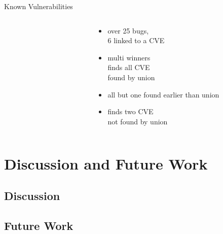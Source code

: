 \documentclass[\HandoutMode,table]{beamer}
\newcommand\figwidth\textwidth
\begin{document}
\begin{frame}{Known Vulnerabilities}
    \begin{columns}
        \begin{column}{.66\textwidth}
            \renewcommand\figwidth{.33\textwidth}
            \vspace{-20pt}
            \begin{figure}
                \vspace{-8pt}
            \end{figure}
        \end{column}
        \begin{column}{.33\textwidth}
            \begin{itemize}
                \item{} over 25 bugs,\\6 linked to a CVE
                \item{} multi winners\\finds all CVE\\found by union
                \item{} all but one found earlier than union
                \item{} finds two CVE\\not found by union
            \end{itemize}
        \end{column}
    \end{columns}
\end{frame}

\section{Discussion and Future Work}

\subsection*{Discussion}

\subsection*{Future Work}
\end{document}
